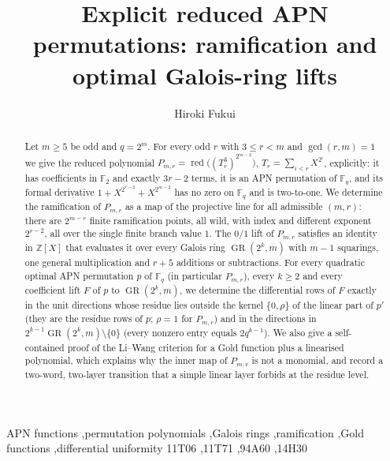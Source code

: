 \documentclass[preprint,12pt]{elsarticle}
\theoremstyle{definition}
\newcommand{\F}{\mathbb{F}}
\newcommand{\Z}{\mathbb{Z}}
\newcommand{\GR}{\operatorname{GR}}
\newcommand{\red}{\operatorname{red}}
\begin{document}
\begin{frontmatter}
\title{Explicit reduced APN permutations: ramification and optimal Galois-ring lifts}
\author[a,b]{Hiroki Fukui}
\begin{abstract}
Let $m\ge5$ be odd and $q=2^m$. For every odd $r$ with $3\le r<m$ and $\gcd(r,m)=1$ we give the reduced polynomial $P_{m,r}=\red\bigl((T_r^3)^{2^{m-2}}\bigr)$, $T_r=\sum_{i<r}X^{2^i}$, explicitly: it has coefficients in $\F_2$ and exactly $3r-2$ terms, it is an APN permutation of $\F_q$, and its formal derivative $1+X^{2^{r-2}}+X^{2^{m-2}}$ has no zero on $\F_q$ and is two-to-one. We determine the ramification of $P_{m,r}$ as a map of the projective line for all admissible $(m,r)$: there are $2^{m-r}$ finite ramification points, all wild, with index and different exponent $2^{r-2}$, all over the single finite branch value $1$. The $0/1$ lift of $P_{m,r}$ satisfies an identity in $\Z[X]$ that evaluates it over every Galois ring $\GR(2^k,m)$ with $m-1$ squarings, one general multiplication and $r+5$ additions or subtractions. For every quadratic optimal APN permutation $p$ of $\F_q$ (in particular $P_{m,r}$), every $k\ge2$ and every coefficient lift $F$ of $p$ to $\GR(2^k,m)$, we determine the differential rows of $F$ exactly in the unit directions whose residue lies outside the kernel $\{0,\rho\}$ of the linear part of $p'$ (they are the residue rows of $p$; $\rho=1$ for $P_{m,r}$) and in the directions in $2^{k-1}\GR(2^k,m)\setminus\{0\}$ (every nonzero entry equals $2q^{k-1}$). We also give a self-contained proof of the Li--Wang criterion for a Gold function plus a linearised polynomial, which explains why the inner map of $P_{m,r}$ is not a monomial, and record a two-word, two-layer transition that a simple linear layer forbids at the residue level.
\end{abstract}
\begin{keyword}
APN functions \sep permutation polynomials \sep Galois rings \sep ramification \sep Gold functions \sep differential uniformity
\MSC[2020] 11T06 \sep 11T71 \sep 94A60 \sep 14H30
\end{keyword}
\end{frontmatter}
\end{document}
